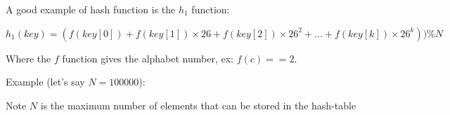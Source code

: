 \documentclass{beamer}[10pt, usepdftitle=false, handout]
\begin{document}
	\begin{frame}
	
	A good example of hash function is the $h_1$ function:
	
	\vspace*{1em}	
	
	\scalebox{0.8} {
	$h_1(key) = (f(key[0]) + f(key[1])\times 26 + f(key[2])\times 26^2  + ... + f(key[k])\times 26^k)) \% N$
	}
	
	\vspace*{1em}
	
	Where the $f$ function gives the alphabet number, ex: $f(c)==2$.
	
	\vspace*{1em}	
	
	Example (let's say $N=100000$):
	
	\vspace*{1em}
	
	\vspace*{0.1em}
	
	\vspace*{0.1em}
	
	
	\vspace*{1em}	
	
	\begin{block}{Note}
	$N$ is the maximum number of elements that can be stored in the hash-table 
	\end{block}	
	
	\end{frame}		
		
\end{document}
